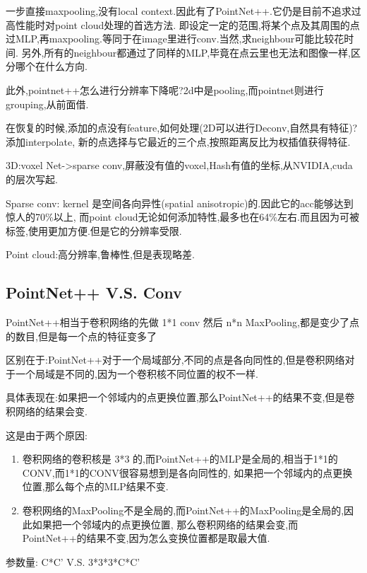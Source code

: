 一步直接maxpooling,没有local context.因此有了PointNet++.它仍是目前不追求过高性能时对point cloud处理的首选方法.
即设定一定的范围,将某个点及其周围的点过MLP,再maxpooling.等同于在image里进行conv.当然,求neighbour可能比较花时间.
另外,所有的neighbour都通过了同样的MLP,毕竟在点云里也无法和图像一样,区分哪个在什么方向.

此外,pointnet++怎么进行分辨率下降呢?2d中是pooling,而pointnet则进行grouping,从前面借.

在恢复的时候,添加的点没有feature,如何处理(2D可以进行Deconv,自然具有特征)?添加interpolate,
新的点选择与它最近的三个点,按照距离反比为权插值获得特征.

3D:voxel Net->sparse conv,屏蔽没有值的voxel,Hash有值的坐标,从NVIDIA,cuda的层次写起.

Sparse conv: kernel 是空间各向异性(spatial anisotropic)的.因此它的acc能够达到惊人的70\%以上,
而point cloud无论如何添加特性,最多也在64\%左右.而且因为可被标签,使用更加方便.但是它的分辨率受限.

Point cloud:高分辨率,鲁棒性,但是表现略差.

\subsection{PointNet++ V.S. Conv}

PointNet++相当于卷积网络的先做 1*1 conv 然后 n*n MaxPooling,都是变少了点的数目,但是每一个点的特征变多了

区别在于:PointNet++对于一个局域部分,不同的点是各向同性的,但是卷积网络对于一个局域是不同的,因为一个卷积核不同位置的权不一样.

具体表现在:如果把一个邻域内的点更换位置,那么PointNet++的结果不变,但是卷积网络的结果会变.

这是由于两个原因:
\begin{enumerate}
    \item 卷积网络的卷积核是 3*3 的,而PointNet++的MLP是全局的,相当于1*1的CONV,而1*1的CONV很容易想到是各向同性的,
    如果把一个邻域内的点更换位置,那么每个点的MLP结果不变.
    \item 卷积网络的MaxPooling不是全局的,而PointNet++的MaxPooling是全局的,因此如果把一个邻域内的点更换位置,
    那么卷积网络的结果会变,而PointNet++的结果不变,因为怎么变换位置都是取最大值.
\end{enumerate}

参数量: C*C' V.S. 3*3*3*C*C'
